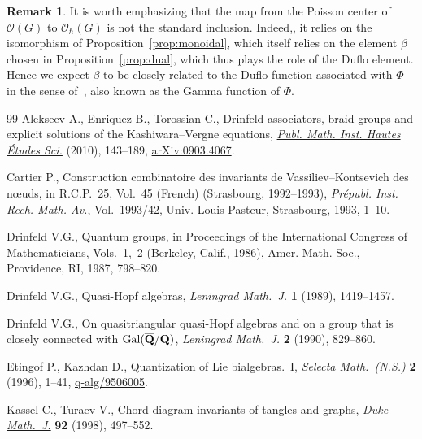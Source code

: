 \documentclass[11pt]{article}
\numberwithin{equation}{section}
\newcommand{\h}{\hslash}
\newcommand{\cO}{\mathcal O}
\theoremstyle{definition}
\newtheorem{rmk}[thm]{Remark}
\begin{document}
	\begin{rmk}\label{rmk:gamma}
		It is worth emphasizing that the map from the Poisson center of $\cO(G)$ to $\cO_\h(G)$ is not the standard inclusion. Indeed,, it relies on the isomorphism of Proposition~\ref{prop:monoidal}, which itself relies on the element $\beta$ chosen in Proposition~\ref{prop:dual}, which thus plays the role of the Duf\/lo element. Hence we expect $\beta$ to be closely related to the Duf\/lo function associated with $\Phi$ in the sense of~\cite{Alekseev2010}, also known as the Gamma function of $\Phi$.
	\end{rmk}
\begin{thebibliography}{99}
Alekseev A., Enriquez B., Torossian C., Drinfeld associators, braid groups and
 explicit solutions of the {K}ashiwara--{V}ergne equations, \href{http://dx.doi.org/10.1007/s10240-010-0029-4}{\textit{Publ.
 Math. Inst. Hautes \'Etudes Sci.}} (2010), 143--189, \href{http://arxiv.org/abs/0903.4067}{arXiv:0903.4067}.

Cartier P., Construction combinatoire des invariants de
 {V}assiliev--{K}ontsevich des n\oe uds, in R.{C}.{P}.~25, {V}ol.~45
 ({F}rench) ({S}trasbourg, 1992--1993), \textit{Pr\'epubl. Inst. Rech. Math.
 Av.}, Vol.~1993/42, Univ. Louis Pasteur, Strasbourg, 1993, 1--10.

Drinfeld V.G., Quantum groups, in Proceedings of the {I}nternational {C}ongress
 of {M}athematicians, {V}ols.~1,~2 ({B}erkeley, {C}alif., 1986), Amer. Math.
 Soc., Providence, RI, 1987, 798--820.

Drinfeld V.G., Quasi-{H}opf algebras, \textit{Leningrad Math.~J.} \textbf{1}
 (1989), 1419--1457.

Drinfeld V.G., On quasitriangular quasi-{H}opf algebras and on a group that is
 closely connected with {${\rm Gal}(\overline{\bf Q}/{\bf Q})$},
 \textit{Leningrad Math.~J.} \textbf{2} (1990), 829--860.

Etingof P., Kazhdan D., Quantization of {L}ie bialgebras.~{I}, \href{http://dx.doi.org/10.1007/BF01587938}{\textit{Selecta
 Math.~(N.S.)}} \textbf{2} (1996), 1--41, \mbox{\href{http://arxiv.org/abs/q-alg/9506005}{q-alg/9506005}}.

Kassel C., Turaev V., Chord diagram invariants of tangles and graphs,
 \href{http://dx.doi.org/10.1215/S0012-7094-98-09215-8}{\textit{Duke Math.~J.}} \textbf{92} (1998), 497--552.


\end{thebibliography}
\end{document}
